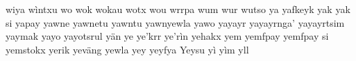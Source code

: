 wiya\hspace{2mm}
wìntxu\hspace{2mm}
wo\hspace{2mm}
wok\hspace{2mm}
wokau\hspace{2mm}
wotx\hspace{2mm}
wou\hspace{2mm}
wrrpa\hspace{2mm}
wum\hspace{2mm}
wur\hspace{2mm}
wutso\hspace{2mm}
ya\hspace{2mm}
yafkeyk\hspace{2mm}
yak\hspace{2mm}
yak si\hspace{2mm}
yapay\hspace{2mm}
yawne\hspace{2mm}
yawnetu\hspace{2mm}
yawntu\hspace{2mm}
yawnyewla\hspace{2mm}
yawo\hspace{2mm}
yayayr\hspace{2mm}
yayayrnga'\hspace{2mm}
yayayrtsim\hspace{2mm}
yaymak\hspace{2mm}
yayo\hspace{2mm}
yayotsrul\hspace{2mm}
yän\hspace{2mm}
ye\hspace{2mm}
ye'krr\hspace{2mm}
ye'rìn\hspace{2mm}
yehakx\hspace{2mm}
yem\hspace{2mm}
yemfpay\hspace{2mm}
yemfpay si\hspace{2mm}
yemstokx\hspace{2mm}
yerik\hspace{2mm}
yeväng\hspace{2mm}
yewla\hspace{2mm}
yey\hspace{2mm}
yeyfya\hspace{2mm}
Yeysu\hspace{2mm}
yì\hspace{2mm}
yìm\hspace{2mm}
yll\hspace{2mm}
